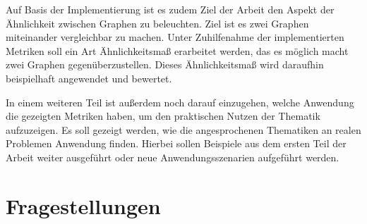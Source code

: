 \documentclass[a4paper,12pt,ngerman,chapterprefix=false,listof=totoc,bibliography=totoc]{scrreprt}
\begin{document}
{Auf Basis der Implementierung ist es zudem Ziel der Arbeit den Aspekt der Ähnlichkeit zwischen Graphen zu beleuchten. Ziel ist es zwei Graphen miteinander vergleichbar zu machen. Unter Zuhilfenahme der implementierten Metriken soll ein Art Ähnlichkeitsmaß erarbeitet werden, das es möglich macht zwei Graphen gegenüberzustellen. Dieses Ähnlichkeitsmaß wird daraufhin beispielhaft angewendet und bewertet.

In einem weiteren Teil ist außerdem noch darauf einzugehen, welche Anwendung die gezeigten Metriken haben, um den praktischen Nutzen der Thematik aufzuzeigen. Es soll gezeigt werden, wie die angesprochenen Thematiken an realen Problemen Anwendung finden. Hierbei sollen Beispiele aus dem ersten Teil der Arbeit weiter ausgeführt oder neue Anwendungsszenarien aufgeführt werden.
}
\section{Fragestellungen}
\end{document}
